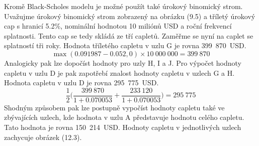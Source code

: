 \documentclass[a4paper]{book}
\begin{document}
Kromě Black-Scholes modelu je možné použít také úrokový binomický strom. Uvažujme úrokový binomický strom zobrazený na obrázku (9.5) a tříletý úrokový cap s hranicí 5.2\%, nominální hodnotou 10 miliónů USD a roční frekvencí splatnosti. Tento cap se tedy skládá ze tří capletů. Zaměřme se nyní na caplet se splatností tři roky. Hodnota tříletého capletu v uzlu G je rovna 399~870~USD.
\begin{equation*}
\max(0.091987 - 0.052,0) \times 10~000~000 = 399~870
\end{equation*}
Analogicky pak lze dopočíst hodnoty pro uzly H, I a J. Pro výpočet hodnoty capletu v uzlu D je pak zapotřebí znalost hodnoty capletu v uzlech G a H. Hodnota capletu v uzlu D je rovna 295~775~USD.
\begin{equation*}
\frac{1}{2}\Bigg( \frac{399~870}{1 + 0.070053} + \frac{233~120}{1 + 0.070053} \Bigg) = 295~775
\end{equation*}
Shodným způsobem pak lze postupně vypočíst hodnoty capletu také ve zbývajících uzlech, kde hodnota v uzlu A představuje hodnotu celého capletu. Tato hodnota je rovna 150~214~USD. Hodnoty capletu v jednotlivých uzlech zachycuje obrázek (12.3).
\end{document}
